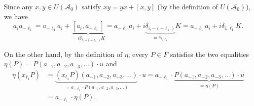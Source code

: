 \documentclass
[numbers=enddot,12pt,final,onecolumn,german,notitlepage]{scrartcl}%
\theoremstyle{definition}
\begin{document}
Since any $x,y\in U\left(  \mathcal{A}_{0}\right)  $ satisfy $xy=yx+\left[
x,y\right]  $ (by the definition of $U\left(  \mathcal{A}_{0}\right)  $), we
have%
\[
a_{i}a_{-\ell_{1}}=a_{-\ell_{1}}a_{i}+\underbrace{\left[  a_{i},a_{-\ell_{1}%
}\right]  }_{=i\delta_{i,-\left(  -\ell_{1}\right)  }K}=a_{-\ell_{1}}%
a_{i}+i\underbrace{\delta_{i,-\left(  -\ell_{1}\right)  }}_{=\delta
_{i,\ell_{1}}}K=a_{-\ell_{1}}a_{i}+i\delta_{i,\ell_{1}}K.
\]


On the other hand, by the definition of $\eta$, every $P\in F$ satisfies the
two equalities $\eta\left(  P\right)  =P\left(  a_{-1},a_{-2},a_{-3}%
,...\right)  \cdot u$ and%
\begin{align}
\eta\left(  x_{\ell_{1}}P\right)   &  =\underbrace{\left(  x_{\ell_{1}%
}P\right)  \left(  a_{-1},a_{-2},a_{-3},...\right)  }_{=a_{-\ell_{1}}\cdot
P\left(  a_{-1},a_{-2},a_{-3},...\right)  }\cdot u=a_{-\ell_{1}}%
\cdot\underbrace{P\left(  a_{-1},a_{-2},a_{-3},...\right)  \cdot u}%
_{=\eta\left(  P\right)  }\nonumber\\
&  =a_{-\ell_{1}}\cdot\eta\left(  P\right)  . \label{lem.V=F.pf.5}%
\end{align}
\end{document}
